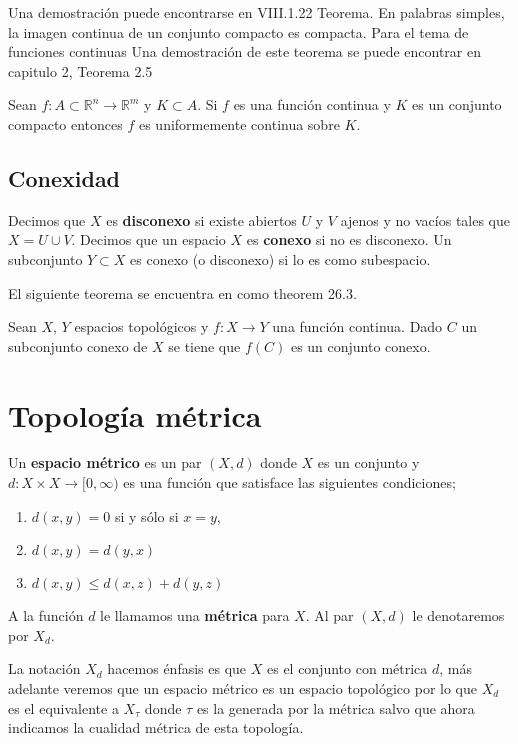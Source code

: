 Una demostración puede encontrarse en \cite{top_prieto} VIII.1.22 Teorema. En palabras simples, la imagen continua de un conjunto compacto es compacta. Para el tema de funciones continuas Una demostración de este teorema se puede encontrar en capitulo 2, Teorema 2.5

\begin{te}
 Sean $f:A \subset \mathbb{R}^n \to \mathbb{R}^m$ y $K \subset A $. Si $f$ es una función continua y $K$ es un conjunto compacto entonces $f$ es uniformemente continua sobre $K$.
\end{te}

\subsection*{Conexidad}
 Decimos que $X$ es \textbf{disconexo} si existe abiertos $U$ y $V$ ajenos y no vacíos tales que $X = U \cup V$. Decimos que un espacio $X$ es \textbf{conexo} si no es disconexo. Un subconjunto $Y \subset X$ es conexo (o disconexo) si lo es como subespacio.

El siguiente teorema se encuentra en \cite{top_willd} como theorem 26.3.

\begin{te}
Sean $X$, $Y$ espacios topológicos y $f:X \to Y$ una función continua. Dado $C$ un subconjunto conexo de $X$ se tiene que $f(C)$ es un conjunto conexo.
\end{te}


\section*{Topología métrica}
Un \textbf{espacio métrico} es un par $(X, d)$ donde $X$ es un conjunto y $d:X \times X \to [0, \infty)$ es una función que satisface las siguientes condiciones;

\begin{enumerate}
\item $d(x,y)=0$ si y sólo si $x=y$,
\item $d(x,y)=d(y,x)$
\item $d(x,y) \leq d(x,z)+d(y,z)$
\end{enumerate}


A la función $d$ le llamamos una \textbf{métrica} para $X$. Al par $(X,d)$ le denotaremos por $X_d$. 

\begin{ob}
La notación $X_d$ hacemos énfasis es que $X$ es el conjunto con métrica $d$, más adelante veremos que un espacio métrico es un espacio topológico por lo que $X_d$ es el equivalente a $X_\tau$ donde $\tau$ es la generada por la métrica salvo que ahora indicamos la cualidad métrica de esta topología.  
\end{ob}

